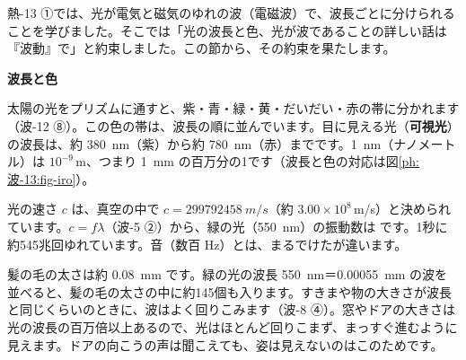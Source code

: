


\leavevmode\label{ph:波-13:sec1}熱-13 ①では、光が電気と磁気のゆれの波（電磁波）で、波長ごとに分けられることを学びました。そこでは「光の波長と色、光が波であることの詳しい話は『波動』で」と約束しました。この節から、その約束を果たします。

\noindent\textbf{波長と色}\par\nobreak
太陽の光をプリズムに通すと、紫・青・緑・黄・だいだい・赤の帯に分かれます（波-12 ⑧）。この色の帯は、波長の順に並んでいます。目に見える光（\textbf{可視光}）の波長は、約 \qty{380}{nm}（紫）から約 \qty{780}{nm}（赤）までです。\qty{1}{nm}（ナノメートル）は $10^{-9}$\,m、つまり \qty{1}{mm} の百万分の1です（波長と色の対応は図\ref{ph:波-13:fig-iro}）。

光の速さ $c$ は、真空の中で $c=\qty{299792458}{m/s}$（約 $3.00\times10^8$\,m/s）と決められています。$c=f\lambda$（波-5 ②）から、緑の光（\qty{550}{nm}）の振動数は
です。1秒に約545兆回ゆれています。音（数百 Hz）とは、まるでけたが違います。

\begin{phmijika}
髪の毛の太さは約 \qty{0.08}{mm} です。緑の光の波長 \qty{550}{nm}＝\qty{0.00055}{mm} の波を並べると、髪の毛の太さの中に約145個も入ります。すきまや物の大きさが波長と同じくらいのときに、波はよく回りこみます（波-8 ④）。窓やドアの大きさは光の波長の百万倍以上あるので、光はほとんど回りこまず、まっすぐ進むように見えます。ドアの向こうの声は聞こえても、姿は見えないのはこのためです。
\end{phmijika}

